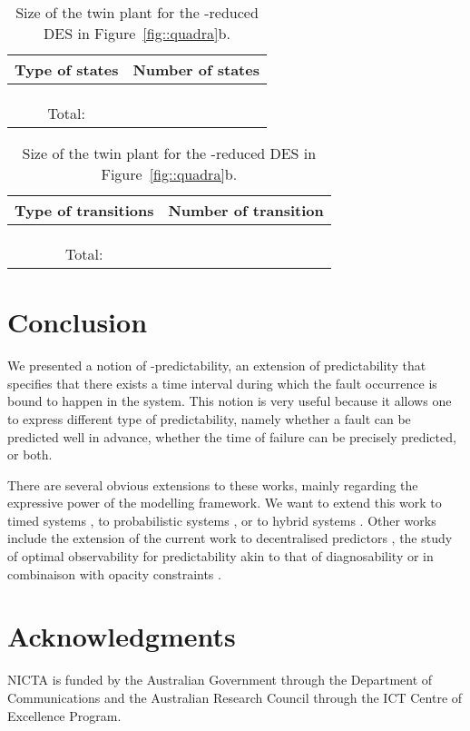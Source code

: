 \documentclass{article}
\begin{document}
\begin{table}[t!]
  \begin{minipage}{.5\linewidth}
    \begin{center}
      \begin{tabular}{c | c}
        Type of states & Number of states\\ 
        \hline 
         & \\
         & \\
         & \\
        \hline
        Total: & 
      \end{tabular}
    \end{center}
  \end{minipage}\begin{minipage}{.5\linewidth}
    \begin{center}
      \begin{tabular}{c | c}
        Type of transitions & Number of transition\\ 
        \hline 
         & \\
         
        & \\
         
        & \\
        \hline
        Total: & 
      \end{tabular}
    \end{center}
  \end{minipage}
  \caption{Size of the twin plant for the -reduced 
  DES in Figure~\ref{fig::quadra}b.}
  \label{tab::tpsize2}
\end{table}

\section{Conclusion}
We presented a notion of -predictability, 
an extension of predictability that specifies 
that there exists a time interval 
during which the fault occurrence is bound to happen in the system.  
This notion is very useful 
because it allows one to express different type of predictability, 
namely whether a fault can be predicted well in advance, 
whether the time of failure can be precisely predicted, 
or both.  

There are several obvious extensions to these works, 
mainly regarding the expressive power of the modelling framework.  
We want to extend this work to timed systems 
\cite{cassez-grastien::formats::13}, 
to probabilistic systems \cite{nouioua-etal::dx::14}, 
or to hybrid systems \cite{bayoudh-etal::ecai::08}.  
Other works include the extension of the current work 
to decentralised predictors \cite{takai-kumar::tac::12}, 
the study of optimal observability for predictability 
akin to that of diagnosability \cite{brandanbriones-etal::dx::08}
or in combinaison with opacity constraints
\cite{chedor-etal::jdeds::14}.  

\section*{Acknowledgments}
NICTA is funded by the Australian Government 
through the Department of Communications 
and the Australian Research Council 
through the ICT Centre of Excellence Program. 



\end{document}
